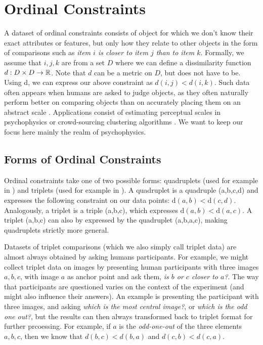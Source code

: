 \section{Ordinal Constraints}
A dataset of ordinal constraints consists of object for which we don't know their exact attributes or features, but only how they relate to other objects
in the form of comparisons such as \textit{item $i$ is closer to item $j$ than to item $k$}. Formally, we assume that $i, j, k$ are from 
a set $D$ where we can define a dissimilarity function $d: D \times D \to \mathbb{R}$. Note that $d$ can be a metric on $D$, but does not have to be.
Using d, we can express our above constraint as $d(i, j) < d(i, k)$. Such data often appears when humans are asked to judge objects, as they often naturally perform better on comparing objects
than on accurately placing them on an abstract scale \citep{stewartAbsoluteIdentificationRelative2005}. Applications consist of estimating perceptual scales in psychophysics 
\citep{haghiriEstimationPerceptualScales2020} or crowd-sourcing clustering algorithms \citep{ukkonenCrowdsourcedCorrelationClustering2017}. 
We want to keep our focus here mainly the realm of psychophysics.


\subsection{Forms of Ordinal Constraints}
Ordinal constraints take one of two possible forms: quadruplets (used for example in \cite{ghoshdastidarFoundationsComparisonBasedHierarchical2019}) and triplets (used for example in \cite{vankadaraInsightsOrdinalEmbedding2021,haghiriComparisonBasedFrameworkPsychophysics2019}).
A quadruplet is a quadruple (a,b,c,d) 
and expresses the following constraint on our data points: $\text{d}(a,b) < \text{d}(c,d)$. 
Analogously, a triplet is a triple (a,b,c), which expresses $\text{d}(a,b) < \text{d}(a,c)$. 
A triplet (a,b,c) can also by expressed by the quadruplet (a,b,a,c), making quadruplets strictly more general. 

Datasets of triplet comparisons (which we also simply call triplet data) are almost always obtained by asking humans participants. For example, we might 
collect triplet data on images by presenting human participants with three images $a,b,c$, 
with image $a$ as anchor point and ask them, \textit{is $b$ or $c$ closer to $a$?}.
The way that participants are questioned varies on the context of the experiment (and might also influence their answers). An
example is presenting the participant with three images, and asking \textit{which is the most central image?}, or \textit{which is the odd one out?},
but the results can then always transformed back to triplet format for further prcoessing. For example, if $a$ is the \textit{odd-one-out} of the three elements $a,b,c$, 
then we know that $d(b,c) < d(b,a)$ and $d(c, b) < d(c,a)$. 

